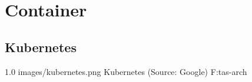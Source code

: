 \chapter{Container}


\section{Kubernetes}

    {1.0}
    {images/kubernetes.png}
    {Kubernetes (Source: Google)}
    {F:tas-arch} 
